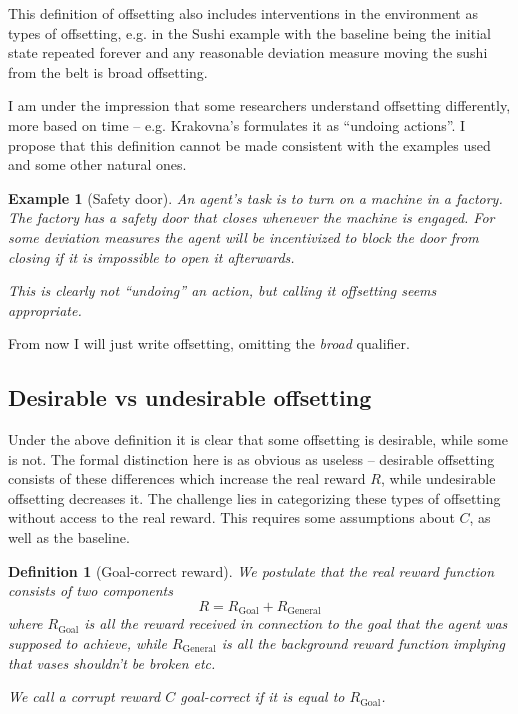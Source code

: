 \documentclass{article}
\newtheorem{definition}{Definition}
\newcommand{\rewardFunction}{R}
\newcommand{\goalRewardFunction}{\rewardFunction_{\mathrm{Goal}}}
\newcommand{\generalRewardFunction}{\rewardFunction_{\mathrm{General}}}
\newcommand{\corruption}{C}
\newtheorem{example}{Example}
\begin{document}
	This definition of offsetting also includes interventions in the environment as types
	of offsetting, e.g. in the Sushi example with the baseline being the initial state repeated
	forever and any reasonable deviation measure moving the sushi from the belt is broad offsetting.

	I am under the impression that some researchers understand offsetting differently,
	more based on time -- e.g. Krakovna's formulates it as ``undoing actions''.
	I propose that this definition cannot be made consistent with the examples used
	and some other natural ones.

	\begin{example}[Safety door]
		An agent's task is to turn on a machine in a factory. The factory has a safety door that
		closes whenever the machine is engaged. For some deviation measures the agent will be
		incentivized to block the door from closing if it is impossible to open it afterwards.

		This is clearly not ``undoing'' an action, but calling it offsetting seems appropriate.
	\label{eg:factory}
	\end{example}

	From now I will just write offsetting, omitting the \emph{broad} qualifier.

	\subsection{Desirable vs undesirable offsetting}
		Under the above definition it is clear that some offsetting is desirable, while some is not.
		The formal distinction here is as obvious as useless -- desirable offsetting consists of these
		differences which increase the real reward $\rewardFunction$, while undesirable
		offsetting decreases it. The challenge lies in categorizing these types of offsetting
		without access to the real reward. This requires some assumptions about $\corruption$, as
		well as the baseline.

		\begin{definition}[Goal-correct reward]
			We postulate that the real reward function consists of two components
			\begin{equation*}
				\rewardFunction = \goalRewardFunction + \generalRewardFunction
			\end{equation*}
			where $\goalRewardFunction$ is all the reward received in connection to the goal that
			the agent was supposed to achieve, while $\generalRewardFunction$ is all the background
			reward function implying that vases shouldn't be broken etc.

			We call a corrupt reward $\corruption$ \emph{goal-correct} if it is equal
			to $\goalRewardFunction$.
			\label{def:goalCorrect}
		\end{definition}
\end{document}
